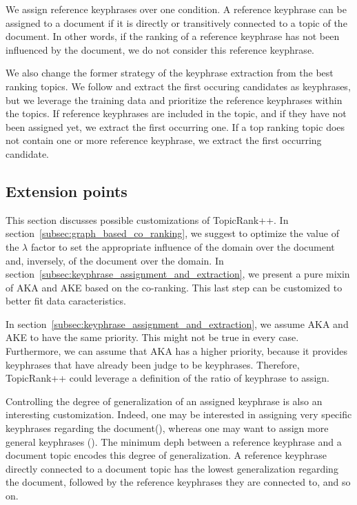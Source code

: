    We assign reference keyphrases over one condition. A reference keyphrase can
    be assigned to a document if it is directly or transitively connected to a
    topic of the document. In other words, if the ranking of a reference
    keyphrase has not been influenced by the document, we do not consider this
    reference keyphrase.

    We also change the former strategy of the keyphrase extraction from the best
    ranking topics. We follow  and extract the
    first occuring candidates as keyphrases, but we leverage the training data
    and prioritize the reference keyphrases within the topics. If reference
    keyphrases are included in the topic, and if they have not been assigned
    yet, we extract the first occurring one. If a top ranking topic does not
    contain one or more reference keyphrase, we extract the first occurring
    candidate.

  \subsection{Extension points}
  \label{subsec:extension_points}
    This section discusses possible customizations of TopicRank++. In
    section~\ref{subsec:graph_based_co_ranking}, we suggest to optimize the
    value of the $\lambda$ factor to set the appropriate influence of the domain
    over the document and, inversely, of the document over the domain. In
    section~\ref{subsec:keyphrase_assignment_and_extraction}, we present a pure
    mixin of AKA and AKE based on the co-ranking. This last step can be
    customized to better fit data caracteristics.

    In section~\ref{subsec:keyphrase_assignment_and_extraction}, we assume AKA
    and AKE to have the same priority. This might not be true in every case.
    Furthermore, we can assume that AKA has a higher priority, because it
    provides keyphrases that have already been judge to be keyphrases.
    Therefore, TopicRank++ could leverage a definition of the ratio of keyphrase
    to assign.

    Controlling the degree of generalization of an assigned keyphrase is also an
    interesting customization. Indeed, one may be interested in assigning very
    specific keyphrases regarding the document(), whereas one may
    want to assign more general keyphrases (). The minimum deph
    between a reference keyphrase and a document topic encodes this degree of
    generalization. A reference keyphrase directly connected to a document topic
    has the lowest generalization regarding the document, followed by the
    reference keyphrases they are connected to, and so on.

